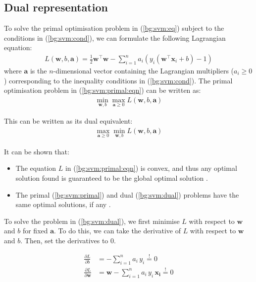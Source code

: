 \documentclass[12pt, twoside, a4paper]{report}
\def\vec{\boldsymbol}
\begin{document}
\subsection{Dual representation}
To solve the primal optimisation problem in (\ref{bg:svm:eq}) subject to the conditions in (\ref{bg:svm:cond}), we can formulate the following Lagrangian equation:
\begin{align}
L(\boldsymbol w, b, \boldsymbol a)
= \frac{1}{2} \boldsymbol w^\top \boldsymbol w - \sum_{i=1}^n a_i (y_i(\boldsymbol w^\top \boldsymbol x_i + b) - 1) \label{bg:svm:primal:eqn}
\end{align}
where $\boldsymbol a$ is the $n$-dimensional vector containing the Lagrangian multipliers ($a_i \geq 0$) corresponding to the inequality conditions in (\ref{bg:svm:cond}). The primal optimisation problem in (\ref{bg:svm:primal:eqn}) can be written as:
\begin{align}
\min_{\boldsymbol w, b} \max_{\boldsymbol a \geq 0} L(\boldsymbol w, b, \vec a) \label{bg:svm:primal}
\end{align}

This can be written as its dual equivalent:
\begin{align}
\max_{\vec a \geq 0} \min_{\vec w, b} L(\vec w, b, \vec a) \label{bg:svm:dual}
\end{align}

It can be shown that:
\begin{itemize}
\item The equation $L$ in (\ref{bg:svm:primal:eqn}) is convex, and thus any optimal solution found is guaranteed to be the global optimal solution \cite{RefWorks:123}.
\item The primal (\ref{bg:svm:primal}) and dual (\ref{bg:svm:dual}) problems have the same optimal solutions, if any \cite{RefWorks:124}.
\end{itemize}

To solve the problem in (\ref{bg:svm:dual}), we first minimise $L$ with respect to $\vec w$ and $b$ for fixed $\vec a$. To do this, we can take the derivative of $L$ with respect to $\vec w$ and $b$. Then, set the derivatives to 0.

\begin{align}
\frac{\partial L}{\partial b} &= - \sum_{i=1}^n a_i \, y_i \overset{!}{=} 0 \nonumber \\
\frac{\partial L}{\partial \vec{w}} &= \vec{w} - \sum_{i=1}^n a_i \, y_i \, \vec{x_i} \overset{!}{=} 0 \label{bg:svm:primal:partial}
\end{align}
\end{document}
